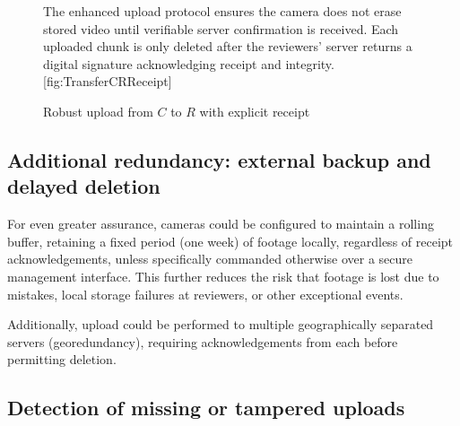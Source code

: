 \begin{figure}
  \begin{sidecaption}
    {%
      The enhanced upload protocol ensures the camera does not erase stored 
      video until verifiable server confirmation is received.
      Each uploaded chunk is only deleted after the reviewers' server returns
      a digital signature acknowledging receipt and integrity.
    }[fig:TransferCRReceipt]
  \flushright
  \begin{msc}
    [/msc/action width=0.4\linewidth]
    {Robust upload from \(C\) to \(R\) with explicit receipt}
      \nextlevel[2]
      \nextlevel[2]
      \nextlevel
  \end{msc}
  \end{sidecaption}
\end{figure}

\subsection{Additional redundancy: external backup and delayed deletion}

For even greater assurance, cameras could be configured to maintain a
rolling buffer, retaining a fixed period (\eg one week) of footage locally,
regardless of receipt acknowledgements, unless specifically commanded
otherwise over a secure management interface.
This further reduces the risk that footage is lost due to mistakes, local
storage failures at reviewers, or other exceptional events.

Additionally, upload could be performed to multiple geographically separated
servers (georedundancy), requiring acknowledgements from each before
permitting deletion.

\subsection{Detection of missing or tampered uploads}

